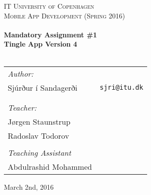 \begin{center}
  \thispagestyle{empty}

  \textsc{\LARGE IT University of Copenhagen}\\[0.5cm]
  \textsc{\Large Mobile App Development (Spring 2016)}\\[2cm]

  \HRule\\[0.4cm]
  {\huge \bfseries Mandatory Assignment \#1 \\Tingle App Version 4 \\[0.4cm]}
  \HRule\\[2cm]

  \begin{tabular}{lr}
  	\textit{Author:} \\
    Sjúrður í Sandagerði      & \texttt{sjri@itu.dk}\\
    \\
    \\
    \textit{Teacher:}\\
    Jørgen Staunstrup \\
    Radoslav Todorov \\
    \\
    \textit{Teaching Assistant}\\
    Abdulrashid Mohammed\\
  \end{tabular}

  \vfill
  {\large March 2nd, 2016}
\end{center}
